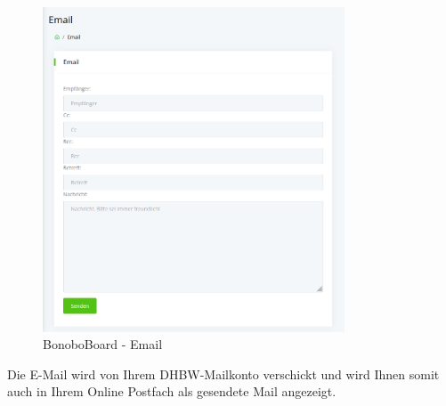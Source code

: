 \documentclass[a4paper,11pt]{scrartcl}
\begin{document}
\begin{figure}[H]
	\begin{center}
		\includegraphics[width=0.8\textwidth]{Mail}
		\caption{BonoboBoard - Email}
		\label{img:mail}
	\end{center}
\end{figure}

\noindent Die E-Mail wird von Ihrem DHBW-Mailkonto verschickt und wird Ihnen somit auch in Ihrem Online Postfach als gesendete Mail angezeigt.

\end{document}
